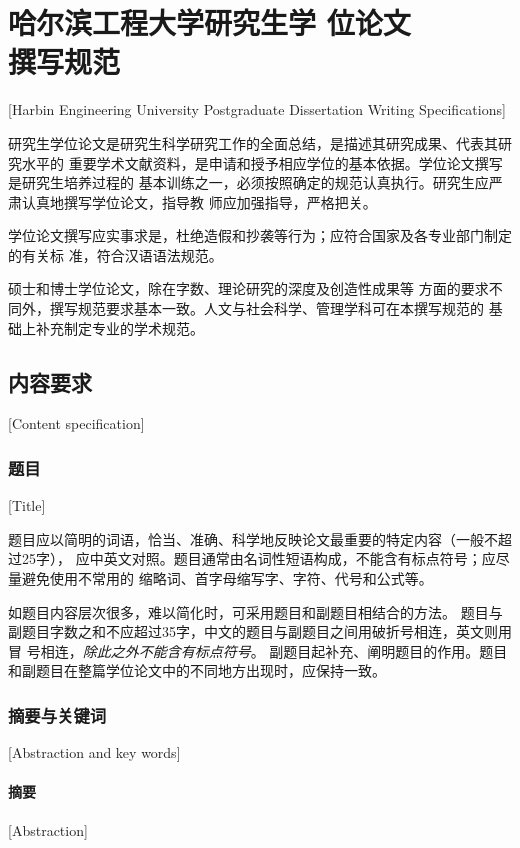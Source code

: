 
\chapter[哈尔滨工程大学研究生学位论文撰写规范]{哈尔滨工程大学研究生学
  位论文\protect\\撰写规范}[Harbin Engineering University Postgraduate Dissertation Writing Specifications]

研究生学位论文是研究生科学研究工作的全面总结，是描述其研究成果、代表其研究水平的
重要学术文献资料，是申请和授予相应学位的基本依据。学位论文撰写是研究生培养过程的
基本训练之一，必须按照确定的规范认真执行。研究生应严肃认真地撰写学位论文，指导教
师应加强指导，严格把关。

学位论文撰写应实事求是，杜绝造假和抄袭等行为；应符合国家及各专业部门制定的有关标
准，符合汉语语法规范。

硕士和博士学位论文，除在字数、理论研究的深度及创造性成果等
方面的要求不同外，撰写规范要求基本一致。人文与社会科学、管理学科可在本撰写规范的
基础上补充制定专业的学术规范。

\section{内容要求}[Content specification]

\subsection{题目}[Title]

题目应以简明的词语，恰当、准确、科学地反映论文最重要的特定内容（一般不超过25字），
应中英文对照。题目通常由名词性短语构成，不能含有标点符号；应尽量避免使用不常用的
缩略词、首字母缩写字、字符、代号和公式等。

如题目内容层次很多，难以简化时，可采用题目和副题目相结合的方法。
题目与副题目字数之和不应超过35字，中文的题目与副题目之间用破折号相连，英文则用冒
号相连，\emph{除此之外不能含有标点符号}。
副题目起补充、阐明题目的作用。题目和副题目在整篇学位论文中的不同地方出现时，应保持一致。

\subsection{摘要与关键词}[Abstraction and key words]
\subsubsection{摘要}[Abstraction]

